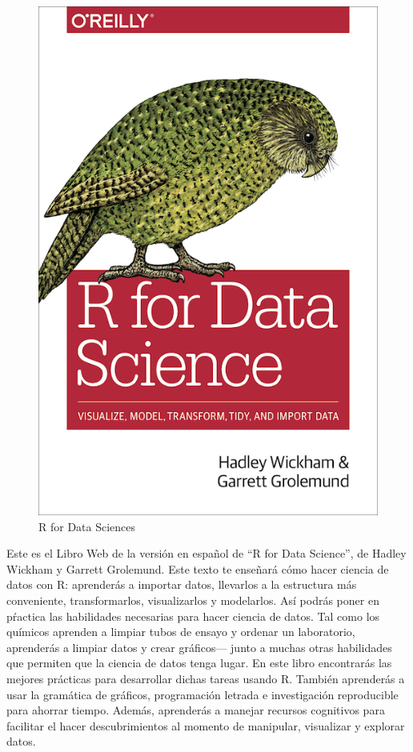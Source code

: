\documentclass[]{article}
\begin{document}
\begin{figure}
\centering
\includegraphics{RforD.png}
\caption{R for Data Sciences}
\end{figure}

Este es el Libro Web de la versión en español de ``R for Data Science'',
de Hadley Wickham y Garrett Grolemund. Este texto te enseñará cómo hacer
ciencia de datos con R: aprenderás a importar datos, llevarlos a la
estructura más conveniente, transformarlos, visualizarlos y modelarlos.
Así podrás poner en pŕactica las habilidades necesarias para hacer
ciencia de datos. Tal como los químicos aprenden a limpiar tubos de
ensayo y ordenar un laboratorio, aprenderás a limpiar datos y crear
gráficos--- junto a muchas otras habilidades que permiten que la ciencia
de datos tenga lugar. En este libro encontrarás las mejores prácticas
para desarrollar dichas tareas usando R. También aprenderás a usar la
gramática de gráficos, programación letrada e investigación reproducible
para ahorrar tiempo. Además, aprenderás a manejar recursos cognitivos
para facilitar el hacer descubrimientos al momento de manipular,
visualizar y explorar datos.
\end{document}
